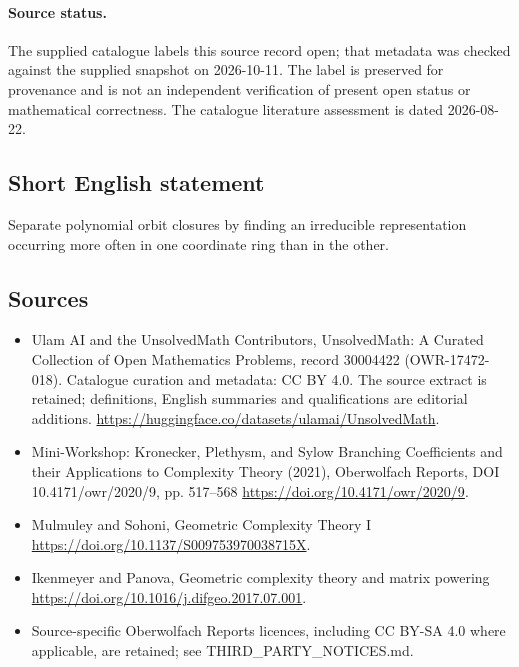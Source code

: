 \documentclass[11pt]{article}
\begin{document}
\paragraph{Source status.}
The supplied catalogue labels this source record open; that metadata was checked against the supplied snapshot on 2026-10-11. The label is preserved for provenance and is not an independent verification of present open status or mathematical correctness. The catalogue literature assessment is dated 2026-08-22.
\subsection{Short English statement}
Separate polynomial orbit closures by finding an irreducible representation occurring more often in one coordinate ring than in the other.
\subsection{Sources}
\begin{itemize}
\item[\hypertarget{source:30004422:1}{S1}] Ulam AI and the UnsolvedMath Contributors, UnsolvedMath: A Curated Collection of Open Mathematics Problems, record 30004422 (OWR-17472-018). Catalogue curation and metadata: CC BY 4.0. The source extract is retained; definitions, English summaries and qualifications are editorial additions.
\url{https://huggingface.co/datasets/ulamai/UnsolvedMath}.
\item[\hypertarget{source:30004422:2}{S2}] Mini-Workshop: Kronecker, Plethysm, and Sylow Branching Coefficients and their Applications to Complexity Theory (2021), Oberwolfach Reports, DOI 10.4171/owr/2020/9, pp. 517--568
\url{https://doi.org/10.4171/owr/2020/9}.
\item[\hypertarget{source:30004422:3}{S3}] Mulmuley and Sohoni, Geometric Complexity Theory I
\url{https://doi.org/10.1137/S009753970038715X}.
\item[\hypertarget{source:30004422:4}{S4}] Ikenmeyer and Panova, Geometric complexity theory and matrix powering
\url{https://doi.org/10.1016/j.difgeo.2017.07.001}.
\item Source-specific Oberwolfach Reports licences, including CC BY-SA 4.0 where applicable, are retained; see THIRD\_PARTY\_NOTICES.md.
\end{itemize}
\end{document}
